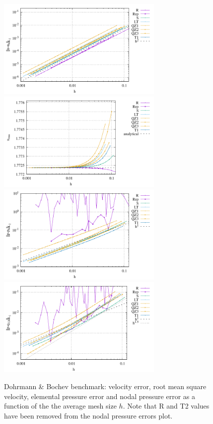 \documentclass[a4paper,12pt]{article}
\begin{document}
\begin{figure}
\centering
\includegraphics[width=8cm]{../results/errors_u_exp9}
\includegraphics[width=8cm]{../results/vrms_exp9} \\
\includegraphics[width=8cm]{../results/errors_p_exp9}
\includegraphics[width=8cm]{../results/errors_q1_exp9}
\caption{Dohrmann \& Bochev benchmark: velocity error, 
root mean square velocity, elemental pressure error and nodal pressure error
as a function of the the average mesh size $h$.
Note that R and T2 values have been removed from the nodal pressure errors plot.} 
\label{fig:resexp9}
\end{figure}
\end{document}
